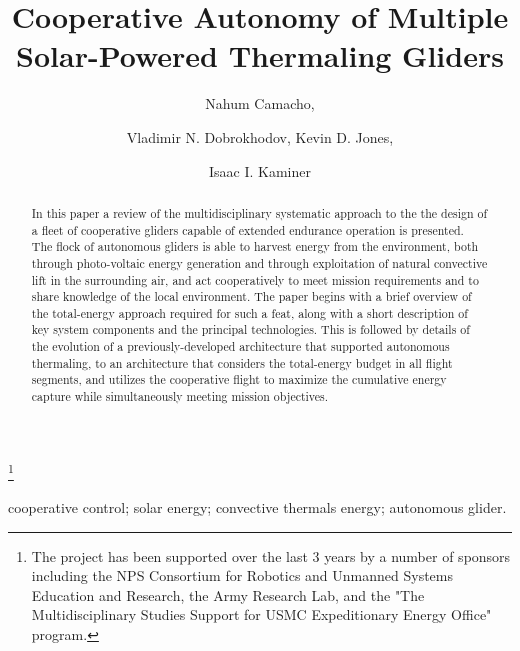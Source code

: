 \documentclass{ifacconf}
\begin{document}
\begin{frontmatter}

\title{Cooperative Autonomy of Multiple Solar-Powered Thermaling Gliders }

\thanks[footnoteinfo]{The project has been supported over the last 3 years by a number of sponsors 
including the NPS Consortium for Robotics and Unmanned Systems Education and Research, the Army 
Research Lab, and the "The Multidisciplinary Studies Support for USMC Expeditionary Energy Office" 
program.}

\author[First]{Nahum Camacho,}
\author[Second]{Vladimir N. Dobrokhodov, Kevin D. Jones,}
\author[Third]{Isaac I. Kaminer}

\address[First]{Graduate student at the Department  of Mechanical and Aerospace Engineering, Naval
Postgraduate School, Monterey, CA 93943 USA (e-mail: ncamacho@nps.edu)}
\address[Second]{Research Associate Professors at the Department  of Mechanical and Aerospace 
Engineering, Naval Postgraduate School, Monterey, CA 93943 USA (e-mail: {vndobrok, kdjones}@nps.edu)}
\address[Third]{Professor at the Department  of Mechanical and Aerospace Engineering, Naval
Postgraduate School, Monterey, CA 93943 USA (e-mail: kaminer@nps.edu)}


\begin{keyword}                           %
cooperative control; solar energy; convective thermals energy; autonomous glider.
\end{keyword}                             %


\begin{abstract}                          %
In this paper a review of the multidisciplinary systematic approach to the the design of
a fleet of cooperative gliders capable of extended endurance operation is presented. The
flock of autonomous gliders is able to harvest energy from the environment, both through
photo-voltaic energy generation and through exploitation of natural convective lift in
the surrounding air, and act cooperatively to meet mission requirements and to share
knowledge of the local environment. The paper begins with a brief overview of the
total-energy approach required for such a feat, along with a short description of key
system components and the principal technologies. This is followed by details of the
evolution of a previously-developed architecture that supported autonomous thermaling, to
an architecture that considers the total-energy budget in all flight segments, and
utilizes the cooperative flight to maximize the cumulative energy capture while
simultaneously meeting mission objectives.
\end{abstract}

\end{frontmatter}
\end{document}
